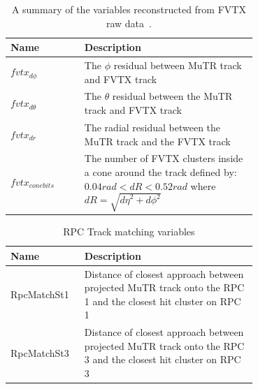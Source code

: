 \begin{table}[h!]
  \centering
  \begin{tabular}{l p{0.7\linewidth}}
    \toprule
    \textbf{Name} & \textbf{Description} \\
    \midrule
    $fvtx_{d\phi}$ & The $\phi$ residual between MuTR track and FVTX track \\
    $fvtx_{d\theta}$ & The $\theta$ residual between the MuTR track and FVTX track \\
    $fvtx_{dr}$ & The radial residual between the MuTR track and the FVTX track \\
    $fvtx_{conebits}$ & The number of FVTX clusters inside a cone around the track defined by: $0.04 rad < dR < 0.52 rad$ where $dR = \sqrt{{d\eta}^2+{d\phi}^2}$\\
    \bottomrule
  \end{tabular}
  \caption{A summary of the variables reconstructed from FVTX raw data~\cite{Meles2015}.}
  \label{tab:fvtx_variables}
\end{table}

\begin{table}[h!]
  \centering
  \begin{tabular}{l p{0.7\linewidth}}
    \toprule
    \textbf{Name} & \textbf{Description} \\
    \midrule
    RpcMatchSt1 & Distance of closest approach between projected MuTR track onto the RPC 1 and the closest hit cluster on RPC 1\\
    RpcMatchSt3 & Distance of closest approach between projected MuTR track onto the RPC 3 and the closest hit cluster on RPC 3\\
    \bottomrule
  \end{tabular}
  \caption{RPC Track matching variables}
  \label{tab:rpc_variables}
\end{table}

